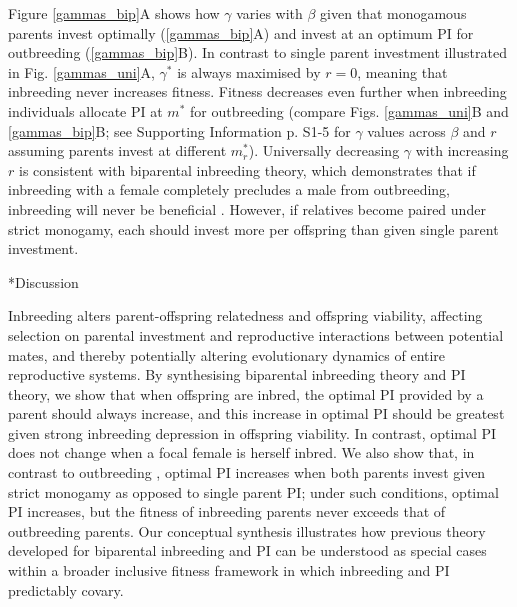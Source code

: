 \documentclass[12pt]{article}
\makeatletter
\renewcommand\section{\@startsection{section}{1}{0in}{-0.5\baselineskip}{0.1\baselineskip}{\normalfont\large\bfseries}}
\makeatother
\begin{document}
Figure \ref{gammas_bip}A shows how $\gamma$ varies with $\beta$ given that monogamous parents invest optimally (\ref{gammas_bip}A) and invest at an optimum PI for outbreeding (\ref{gammas_bip}B). In contrast to single parent investment illustrated in Fig. \ref{gammas_uni}A, $\gamma^{*}$ is always maximised by $r=0$, meaning that inbreeding never increases fitness. Fitness decreases even further when inbreeding individuals allocate PI at $m^{*}$ for outbreeding (compare Figs. \ref{gammas_uni}B and \ref{gammas_bip}B; see Supporting Information p. S1-5 for $\gamma$ values across $\beta$ and $r$ assuming parents invest at different $m^{*}_{r}$). Universally decreasing $\gamma$ with increasing $r$ is consistent with biparental inbreeding theory, which demonstrates that if inbreeding with a female completely precludes a male from outbreeding, inbreeding will never be beneficial \cite[][]{Waser1986, Duthie2015a}. However, if relatives become paired under strict monogamy, each should invest more per offspring than given single parent investment.


\section*{Discussion}

Inbreeding alters parent-offspring relatedness and offspring viability, affecting selection on parental investment and reproductive interactions between potential mates, and thereby potentially altering evolutionary dynamics of entire reproductive systems. By synthesising biparental inbreeding theory and PI theory, we show that when offspring are inbred, the optimal PI provided by a parent should always increase, and this increase in optimal PI should be greatest given strong inbreeding depression in offspring viability. In contrast, optimal PI does not change when a focal female is herself inbred. We also show that, in contrast to outbreeding \cite[][]{Parker1985}, optimal PI increases when both parents invest given strict monogamy as opposed to single parent PI; under such conditions, optimal PI increases, but the fitness of inbreeding parents never exceeds that of outbreeding parents. Our conceptual synthesis illustrates how previous theory developed for biparental inbreeding \cite[][]{Parker1979, Parker2006} and PI \cite[][]{Macnair1978, Parker1978} can be understood as special cases within a broader inclusive fitness framework in which inbreeding and PI predictably covary.
\end{document}
